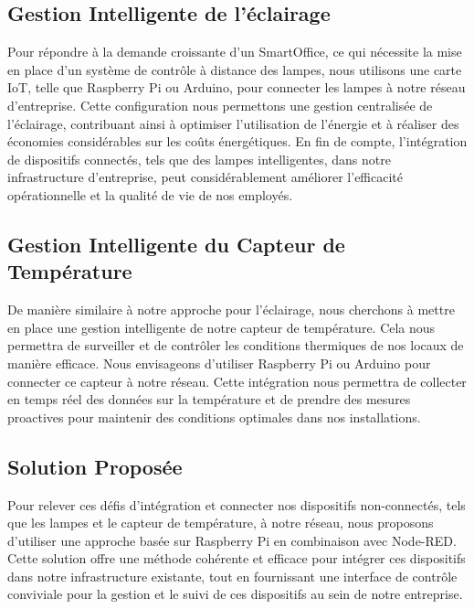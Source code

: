 \subsection{Gestion Intelligente de l'éclairage}

Pour répondre à la demande croissante d'un SmartOffice, ce qui nécessite la mise en place d'un système de contrôle à distance des lampes, nous utilisons une carte IoT, telle que Raspberry Pi ou Arduino, pour connecter les lampes à notre réseau d'entreprise. Cette configuration nous permettons une gestion centralisée de l'éclairage, contribuant ainsi à optimiser l'utilisation de l'énergie et à réaliser des économies considérables sur les coûts énergétiques. En fin de compte, l'intégration de dispositifs connectés, tels que des lampes intelligentes, dans notre infrastructure d'entreprise, peut considérablement améliorer l'efficacité opérationnelle et la qualité de vie de nos employés.

\subsection{Gestion Intelligente du Capteur de Température}

De manière similaire à notre approche pour l'éclairage, nous cherchons à mettre en place une gestion intelligente de notre capteur de température. Cela nous permettra de surveiller et de contrôler les conditions thermiques de nos locaux de manière efficace. Nous envisageons d'utiliser Raspberry Pi ou Arduino pour connecter ce capteur à notre réseau. Cette intégration nous permettra de collecter en temps réel des données sur la température et de prendre des mesures proactives pour maintenir des conditions optimales dans nos installations.


\subsection{Solution Proposée}

Pour relever ces défis d'intégration et connecter nos dispositifs non-connectés, tels que les lampes et le capteur de température, à notre réseau, nous proposons d'utiliser une approche basée sur Raspberry Pi en combinaison avec Node-RED. Cette solution offre une méthode cohérente et efficace pour intégrer ces dispositifs dans notre infrastructure existante, tout en fournissant une interface de contrôle conviviale pour la gestion et le suivi de ces dispositifs au sein de notre entreprise.





